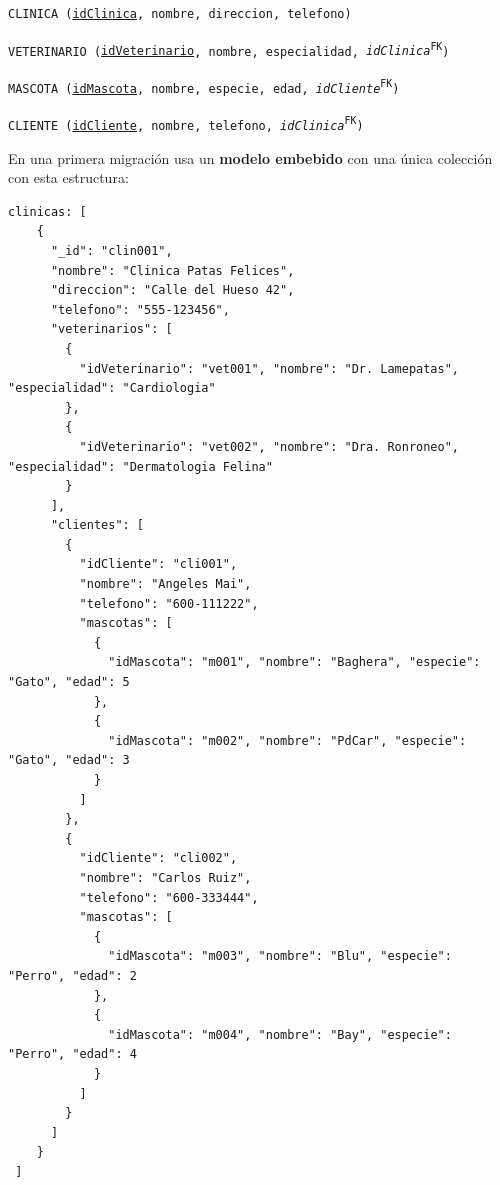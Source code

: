 \documentclass[
    12pt,
    a4paper,
    addpoints,
    answers,
    convocatoria=ext,
    titulacion=NoCD,
    curso=2024/2025,
]{db-exam}
\begin{document}
\begin{questions}
\texttt{CLINICA (\underline{idClinica}, nombre, direccion, telefono)}

\texttt{VETERINARIO (\underline{idVeterinario}, nombre, especialidad, \textit{idClinica}\textsuperscript{FK})}

\texttt{MASCOTA (\underline{idMascota}, nombre, especie, edad, \textit{idCliente}\textsuperscript{FK})}

\texttt{CLIENTE (\underline{idCliente}, nombre, telefono, \textit{idClinica}\textsuperscript{FK})}

En una primera migración usa un \textbf{modelo embebido} con una única colección con esta estructura:

\begin{lstlisting}[basicstyle=\scriptsize\ttfamily]
 clinicas: [
    {
      "_id": "clin001",
      "nombre": "Clinica Patas Felices",
      "direccion": "Calle del Hueso 42",
      "telefono": "555-123456",
      "veterinarios": [
        {
          "idVeterinario": "vet001", "nombre": "Dr. Lamepatas", "especialidad": "Cardiologia"
        },
        {
          "idVeterinario": "vet002", "nombre": "Dra. Ronroneo", "especialidad": "Dermatologia Felina"
        }
      ],
      "clientes": [
        {
          "idCliente": "cli001",
          "nombre": "Angeles Mai",
          "telefono": "600-111222",
          "mascotas": [
            {
              "idMascota": "m001", "nombre": "Baghera", "especie": "Gato", "edad": 5
            },
            {
              "idMascota": "m002", "nombre": "PdCar", "especie": "Gato", "edad": 3
            }
          ]
        },
        {
          "idCliente": "cli002",
          "nombre": "Carlos Ruiz",
          "telefono": "600-333444",
          "mascotas": [
            {
              "idMascota": "m003", "nombre": "Blu", "especie": "Perro", "edad": 2
            },
            {
              "idMascota": "m004", "nombre": "Bay", "especie": "Perro", "edad": 4
            }
          ]
        }
      ]
    }
 ]
\end{lstlisting}

\newpage
{}
\end{questions}
\end{document}
